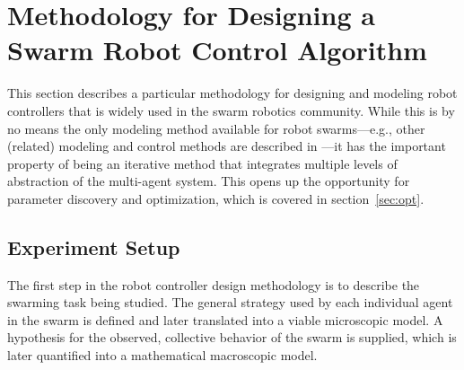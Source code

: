 \documentclass[Main.tex]{subfiles}
\begin{document}
\section{Methodology for Designing a Swarm Robot Control Algorithm}\label{sec:methods}

This section describes a particular methodology for designing and modeling robot controllers that is widely used in the swarm robotics community. While this is by no means the only modeling method available for robot swarms---e.g., other (related) modeling and control methods are described in \cite{Bayazit2005,Berman2007,Billard1999,Sugawara2013}---it has the important property of being an iterative method that integrates multiple levels of abstraction of the multi-agent system. This opens up the opportunity for parameter discovery and optimization, which is covered in section~\ref{sec:opt}.


\subsection{Experiment Setup}
The first step in the robot controller design methodology is to describe the swarming task being studied. The general strategy used by each individual agent in the swarm is defined and later translated into a viable microscopic model. A hypothesis for the observed, collective behavior of the swarm is supplied, which is later quantified into a mathematical macroscopic model.
\end{document}
